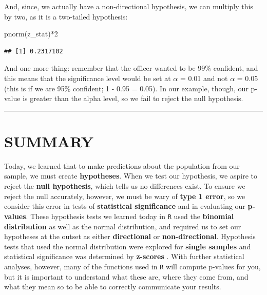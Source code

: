 \documentclass[
]{book}
\newenvironment{Shaded}{\begin{snugshade}}{\end{snugshade}}
\newcommand{\DecValTok}[1]{\textcolor[rgb]{0.00,0.00,0.81}{#1}}
\newcommand{\FunctionTok}[1]{\textcolor[rgb]{0.00,0.00,0.00}{#1}}
\newcommand{\NormalTok}[1]{#1}
\newcommand{\SpecialCharTok}[1]{\textcolor[rgb]{0.00,0.00,0.00}{#1}}
\begin{document}
And, since, we actually have a non-directional hypothesis, we can multiply this by two, as it is a two-tailed hypothesis:

\begin{Shaded}
\begin{Highlighting}[]
\FunctionTok{pnorm}\NormalTok{(z\_stat)}\SpecialCharTok{*}\DecValTok{2}
\end{Highlighting}
\end{Shaded}

\begin{verbatim}
## [1] 0.2317102
\end{verbatim}

And one more thing: remember that the officer wanted to be 99\% confident, and this means that the significance level would be set at \(\alpha\) = 0.01 and not \(\alpha\) = 0.05 (this is if we are 95\% confident; 1 - 0.95 = 0.05). In our example, though, our p-value is greater than the alpha level, so we fail to reject the null hypothesis.

\begin{center}\rule{0.5\linewidth}{0.5pt}\end{center}

\hypertarget{summary-5}{%
\section{SUMMARY}\label{summary-5}}

Today, we learned that to make predictions about the population from our sample, we must create \textbf{hypotheses}. When we test our hypothesis, we aspire to reject the \textbf{null hypothesis}, which tells us no differences exist. To ensure we reject the null accurately, however, we must be wary of \textbf{type 1 error}, so we consider this error in tests of \textbf{statistical significance} and in evaluating our \textbf{p-values}. These hypothesis tests we learned today in \texttt{R} used the \textbf{binomial distribution} as well as the normal distribution, and required us to set our hypotheses at the outset as either \textbf{directional} or \textbf{non-directional}. Hypothesis tests that used the normal distribution were explored for \textbf{single samples} and statistical significance was determined by \textbf{z-scores} . With further statistical analyses, however, many of the functions used in \texttt{R} will compute p-values for you, but it is important to understand what these are, where they come from, and what they mean so to be able to correctly communicate your results.
\end{document}
